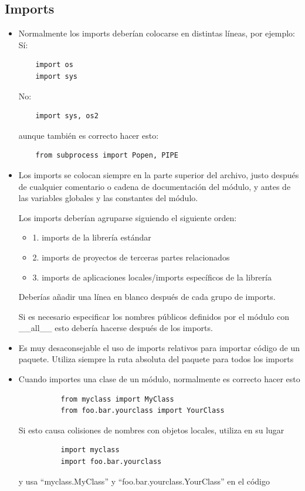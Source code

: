 \documentclass[a4paper,11pt,oneside]{book}
\begin{document}
\subsection{Imports}
\begin{itemize}
\item Normalmente los imports deberían colocarse en distintas líneas, por ejemplo:
Sí:
\begin{lstlisting}
    import os
    import sys
\end{lstlisting}
No:
\begin{lstlisting}
    import sys, os2
\end{lstlisting}
aunque también es correcto hacer esto:
\begin{lstlisting}
    from subprocess import Popen, PIPE
\end{lstlisting}
\item Los imports se colocan siempre en la parte superior del archivo, justo después de cualquier comentario o cadena de documentación del módulo, y antes de las variables globales y las constantes del módulo.

Los imports deberían agruparse siguiendo el siguiente orden:
\begin{itemize}
\item   1. imports de la librería estándar
\item   2. imports de proyectos de terceras partes relacionados
\item   3. imports de aplicaciones locales/imports específicos de la librería
\end{itemize}
Deberías añadir una línea en blanco después de cada grupo de imports.

Si es necesario especificar los nombres públicos definidos por el módulo con \_\_all\_\_ esto debería hacerse después de los imports.

\item Es muy desaconsejable el uso de imports relativos para importar código de un paquete. Utiliza siempre la ruta absoluta del paquete para todos los imports

\item Cuando importes una clase de un módulo, normalmente es correcto hacer esto
\begin{lstlisting}
          from myclass import MyClass
          from foo.bar.yourclass import YourClass
\end{lstlisting}
      Si esto causa colisiones de nombres con objetos locales, utiliza en su lugar
\begin{lstlisting}
          import myclass
          import foo.bar.yourclass
\end{lstlisting}
      y usa ``myclass.MyClass'' y ``foo.bar.yourclass.YourClass'' en el código
\end{itemize}
\end{document}
